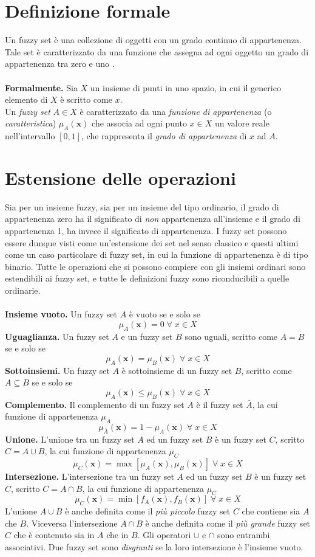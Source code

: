 \documentclass [10pt,a4paper,twoside,openright] {book}
\begin{document}
\section{Definizione formale}
Un fuzzy set è una collezione di oggetti con un grado continuo di appartenenza. Tale set è caratterizzato da una funzione che assegna ad ogni oggetto un grado di appartenenza tra zero e uno \cite{zadeh1965fuzzy}.\\\\
\textbf{Formalmente.} Sia $X$ un insieme di punti in uno spazio, in cui il generico elemento di $X$ è scritto come $x$.\\
Un \textit{fuzzy set} $A \in X$ è caratterizzato da una \textit{funzione di appartenenza} (o \textit{caratteristica}) $\mu_A(\mathbf{x})$ che associa ad ogni punto $x \in X$ un valore reale nell'intervallo $[0, 1]$, che rappresenta il \textit{grado di appartenenza} di $x$ ad $A$.
\section{Estensione delle operazioni}
Sia per un insieme fuzzy, sia per un insieme del tipo ordinario, il grado di appartenenza zero ha il significato di \emph{non} appartenenza all'insieme e il grado di appartenenza 1, ha invece il significato di appartenenza. I fuzzy set possono essere dunque visti come un'estensione dei set nel senso classico e questi ultimi come un caso particolare di fuzzy set, in cui la funzione di appartenenza è di tipo binario. Tutte le operazioni che si possono compiere con gli insiemi ordinari sono estendibili ai fuzzy set, e tutte le definizioni fuzzy sono riconducibili a quelle ordinarie.\\\\
\textbf{Insieme vuoto.} Un fuzzy set $A$ è vuoto se e solo se
\[ \mu_A(\mathbf{x}) = 0 \; \forall \; x \in X\] 
\textbf{Uguaglianza.} Un fuzzy set $A$ e un fuzzy set $B$ sono uguali, scritto come $A=B$ se e solo se
\[ \mu_A(\mathbf{x}) = \mu_B(\mathbf{x}) \; \forall \; x \in X\] 
\textbf{Sottoinsiemi.} Un fuzzy set $A$ è sottoinsieme di un fuzzy set $B$, scritto come $A \subseteq B$ se e solo se
\[ \mu_A(\mathbf{x}) \leq \mu_B(\mathbf{x}) \; \forall \; x \in X\] 
\textbf{Complemento.} Il complemento di un fuzzy set $A$ è il fuzzy set $\bar{A}$, la cui funzione di appartenenza $\mu_{\bar{A}}$
\[ \mu_{\bar{A}}(\mathbf{x}) = 1-\mu_A(\mathbf{x}) \; \forall \; x \in X\] 
\textbf{Unione.} L'unione tra un fuzzy set $A$ ed un fuzzy set $B$ è un fuzzy set $C$, scritto $C=A \cup B$, la cui funzione di appartenenza $\mu_C$
\[ \mu_C(\mathbf{x}) = \max[\mu_A(\mathbf{x}), \mu_B(\mathbf{x})] \; \forall \; x \in X\] 
\textbf{Intersezione.} L'intersezione tra un fuzzy set $A$ ed un fuzzy set $B$ è un fuzzy set $C$, scritto $C=A \cap B$, la cui funzione di appartenenza $\mu_C$
\[ \mu_C(\mathbf{x}) = \min[f_A(\mathbf{x}), f_B(\mathbf{x})] \; \forall \; x \in X\] 
L'unione $A \cup B$ è anche definita come il \textit{più piccolo} fuzzy set $C$ che contiene sia $A$ che $B$. Viceversa l'intersezione $A \cap B$ è anche definita come il \textit{più grande} fuzzy set $C$ che è contenuto sia in $A$ che in $B$. Gli operatori $\cup$ e $\cap$ sono entrambi associativi. Due fuzzy set sono \textit{disgiunti} se la loro intersezione è l'insieme vuoto.
\end{document}
